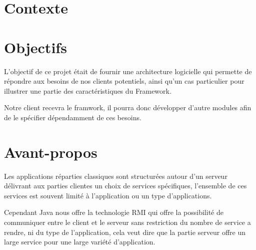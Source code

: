 














\section{Contexte}

\section{Objectifs}

L’objectif de ce projet était de fournir une architecture logicielle qui permette de répondre aux besoins de nos clients potentiels, ainsi qu’un cas particulier pour illustrer une partie des caractéristiques du Framework.

Notre client recevra le framwork, il pourra donc développer d’autre modules afin de le spécifier dépendamment de ces besoins.    

\section{Avant-propos}

Les applications réparties classiques sont structurées autour d'un serveur délivrant aux parties clientes un choix de services spécifiques, l'ensemble de ces services est souvent limité à l'application ou un type d'applications.

Cependant Java nous offre la technologie RMI qui offre la possibilité de communiquer entre le client et le serveur sans restriction du nombre de service a rendre, ni du type de l’application, cela veut dire que la partie serveur offre un large service pour une large variété d’application.